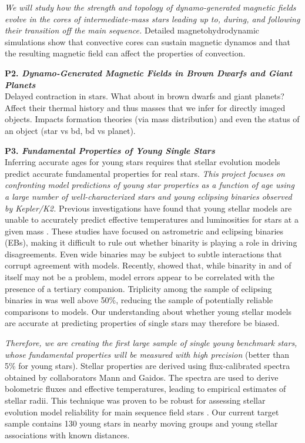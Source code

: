 \documentclass[12pt,a4paper]{article}
\begin{document}
{\it We will study how the strength and topology of dynamo-generated magnetic fields evolve in the cores of intermediate-mass stars leading up to, during, and following their transition off the main sequence.} Detailed magnetohydrodynamic simulations show that convective cores can sustain magnetic dynamos and that the resulting magnetic field can affect the properties of convection.


\textbf{P2. \emph{Dynamo-Generated Magnetic Fields in Brown Dwarfs and Giant Planets}} \\
Delayed contraction in stars. What about in brown dwarfs and giant planets? Affect their thermal history and thus masses that we infer for directly imaged objects. Impacts formation theories (via mass distribution) and even the status of an object (star vs bd, bd vs planet).

\textbf{P3. \emph{Fundamental Properties of Young Single Stars}} \\
Inferring accurate ages for young stars requires that stellar evolution models predict accurate fundamental properties for real stars. {\it This project focuses on confronting model predictions of young star properties as a function of age using a large number of well-characterized stars and young eclipsing binaries observed by Kepler/K2.}
Previous investigations have found that young stellar models are unable to accurately predict effective temperatures and luminosities for stars at a given mass \citep[e.g.,][]{Hillenbrand2004, Mathieu2007, Stassun2014}. These studies have focused on astrometric and eclipsing binaries (EBs), making it difficult to rule out whether binarity is playing a role in driving disagreements. Even wide binaries may be subject to subtle interactions that corrupt agreement with models. Recently, \citet{Stassun2014} showed that, while binarity in and of itself may not be a problem, model errors appear to be correlated with the presence of a tertiary companion. Triplicity among the sample of eclipsing binaries in \citet{Stassun2014} was well above 50\%, reducing the sample of potentially reliable comparisons to models. Our understanding about whether young stellar models are accurate at predicting properties of single stars may therefore be biased.

{\it Therefore, we are creating the first large sample of single young benchmark stars, whose fundamental properties will be measured with high precision} (better than 5\% for young stars). Stellar properties are derived using flux-calibrated spectra obtained by collaborators Mann and Gaidos. The spectra are used to derive bolometric fluxes and effective temperatures, leading to empirical estimates of stellar radii. This technique was proven to be robust for assessing stellar evolution model reliability for main sequence field stars \citep{Mann2015b}. Our current target sample contains 130 young stars in nearby moving groups and young stellar associations with known distances.
\end{document}
